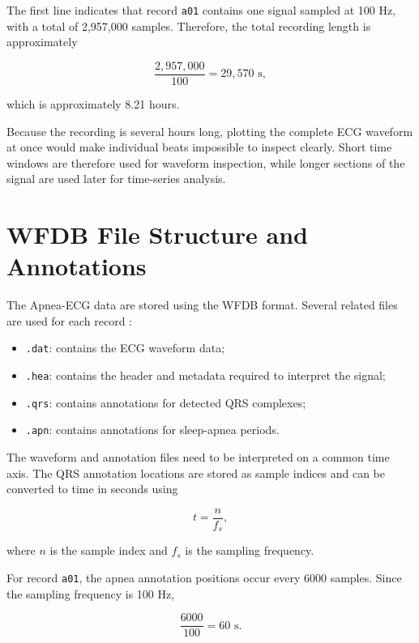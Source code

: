 \documentclass[a4paper,10.5pt,oneside]{report}
\begin{document}
The first line indicates that record \texttt{a01} contains one signal sampled at
100 Hz, with a total of 2,957,000 samples. Therefore, the total recording length
is approximately

\begin{equation}
\frac{2{,}957{,}000}{100}
=
29{,}570 \text{ s},
\end{equation}

which is approximately 8.21 hours.

Because the recording is several hours long, plotting the complete ECG waveform
at once would make individual beats impossible to inspect clearly. Short time
windows are therefore used for waveform inspection, while longer sections of
the signal are used later for time-series analysis.

\section{WFDB File Structure and Annotations}

The Apnea-ECG data are stored using the WFDB format. Several related files are
used for each record \cite{wfdbguide}:

\begin{itemize}
    \item \texttt{.dat}: contains the ECG waveform data;
    \item \texttt{.hea}: contains the header and metadata required to interpret
    the signal;
    \item \texttt{.qrs}: contains annotations for detected QRS complexes;
    \item \texttt{.apn}: contains annotations for sleep-apnea periods.
\end{itemize}

The waveform and annotation files need to be interpreted on a common time axis.
The QRS annotation locations are stored as sample indices and can be converted
to time in seconds using

\begin{equation}
t = \frac{n}{f_s},
\end{equation}

where $n$ is the sample index and $f_s$ is the sampling frequency.

For record \texttt{a01}, the apnea annotation positions occur every 6000
samples. Since the sampling frequency is 100 Hz,

\begin{equation}
\frac{6000}{100}
=
60 \text{ s}.
\end{equation}
\end{document}
